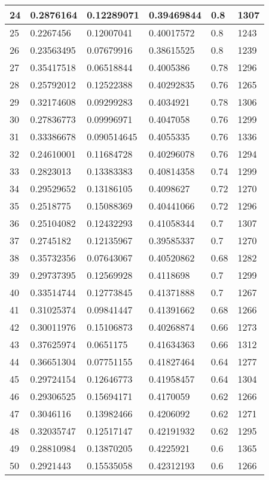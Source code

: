\begin{longtable}{|l|l|l|l|l|l|}
24 & 0.2876164 & 0.12289071 & 0.39469844 & 0.8 & 1307 \\ \hline 
25 & 0.2267456 & 0.12007041 & 0.40017572 & 0.8 & 1243 \\ \hline 
26 & 0.23563495 & 0.07679916 & 0.38615525 & 0.8 & 1239 \\ \hline 
27 & 0.35417518 & 0.06518844 & 0.4005386 & 0.78 & 1296 \\ \hline 
28 & 0.25792012 & 0.12522388 & 0.40292835 & 0.76 & 1265 \\ \hline 
29 & 0.32174608 & 0.09299283 & 0.4034921 & 0.78 & 1306 \\ \hline 
30 & 0.27836773 & 0.09996971 & 0.4047058 & 0.76 & 1299 \\ \hline 
31 & 0.33386678 & 0.090514645 & 0.4055335 & 0.76 & 1336 \\ \hline 
32 & 0.24610001 & 0.11684728 & 0.40296078 & 0.76 & 1294 \\ \hline 
33 & 0.2823013 & 0.13383383 & 0.40814358 & 0.74 & 1299 \\ \hline 
34 & 0.29529652 & 0.13186105 & 0.4098627 & 0.72 & 1270 \\ \hline 
35 & 0.2518775 & 0.15088369 & 0.40441066 & 0.72 & 1296 \\ \hline 
36 & 0.25104082 & 0.12432293 & 0.41058344 & 0.7 & 1307 \\ \hline 
37 & 0.2745182 & 0.12135967 & 0.39585337 & 0.7 & 1270 \\ \hline 
38 & 0.35732356 & 0.07643067 & 0.40520862 & 0.68 & 1282 \\ \hline 
39 & 0.29737395 & 0.12569928 & 0.4118698 & 0.7 & 1299 \\ \hline 
40 & 0.33514744 & 0.12773845 & 0.41371888 & 0.7 & 1267 \\ \hline 
41 & 0.31025374 & 0.09841447 & 0.41391662 & 0.68 & 1266 \\ \hline 
42 & 0.30011976 & 0.15106873 & 0.40268874 & 0.66 & 1273 \\ \hline 
43 & 0.37625974 & 0.0651175 & 0.41634363 & 0.66 & 1312 \\ \hline 
44 & 0.36651304 & 0.07751155 & 0.41827464 & 0.64 & 1277 \\ \hline 
45 & 0.29724154 & 0.12646773 & 0.41958457 & 0.64 & 1304 \\ \hline 
46 & 0.29306525 & 0.15694171 & 0.4170059 & 0.62 & 1266 \\ \hline 
47 & 0.3046116 & 0.13982466 & 0.4206092 & 0.62 & 1271 \\ \hline 
48 & 0.32035747 & 0.12517147 & 0.42191932 & 0.62 & 1295 \\ \hline 
49 & 0.28810984 & 0.13870205 & 0.4225921 & 0.6 & 1365 \\ \hline 
50 & 0.2921443 & 0.15535058 & 0.42312193 & 0.6 & 1266 \\ \hline 
\end{longtable}